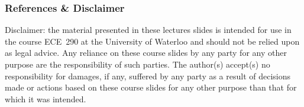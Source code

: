 \begin{frame}
\frametitle{References \& Disclaimer}

{\scriptsize

}
\vfill

{\tiny Disclaimer: the material presented in these lectures slides is intended for use in the course ECE~290 at the University of Waterloo and should not be relied upon as legal advice. Any reliance on these course slides by any party for any other purpose are the responsibility of such parties.  The author(s) accept(s) no responsibility for damages, if any, suffered by any party as a result of decisions made or actions based on these course slides for any other purpose than that for which it was intended.\par}


\end{frame}

